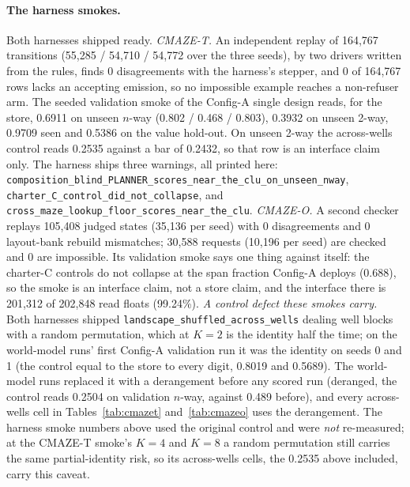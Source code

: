 \documentclass{article} %
\begin{document}
\paragraph{The harness smokes.} Both harnesses shipped ready.
\emph{CMAZE-T.} An independent replay of 164,767 transitions (55,285 / 54,710 / 54,772 over the
three seeds), by two drivers written from the rules, finds 0 disagreements with the harness's
stepper, and 0 of 164,767 rows lacks an accepting emission, so no impossible example reaches a
non-refuser arm. The seeded validation smoke of the Config-A single design reads, for the store,
0.6911 on unseen $n$-way (0.802 / 0.468 / 0.803), 0.3932 on unseen 2-way, 0.9709 seen and 0.5386
on the value hold-out. On unseen 2-way the across-wells control reads 0.2535 against a bar of
0.2432, so that row is an interface claim only. The harness ships three warnings, all printed here:\\
\texttt{composition\_blind\_PLANNER\_scores\_near\_the\_clu\_on\_unseen\_nway},\\
\texttt{charter\_C\_control\_did\_not\_collapse}, and\\
\texttt{cross\_maze\_lookup\_floor\_scores\_near\_the\_clu}.
\emph{CMAZE-O.} A second checker replays 105,408 judged states (35,136 per seed) with 0
disagreements and 0 layout-bank rebuild mismatches; 30,588 requests (10,196 per seed) are checked
and 0 are impossible. Its validation smoke says one thing against itself: the charter-C controls
do not collapse at the span fraction Config-A deploys (0.688), so the smoke is an interface claim,
not a store claim, and the interface there is 201,312 of 202,848 read floats (99.24\%).
\emph{A control defect these smokes carry.} Both harnesses shipped
\texttt{landscape\_shuffled\_across\_wells} dealing well blocks with a random permutation, which at
$K=2$ is the identity half the time; on the world-model runs' first Config-A validation run it was
the identity on seeds 0 and 1 (the control equal to the store to every digit, 0.8019 and 0.5689).
The world-model runs replaced it with a derangement before any scored run (deranged, the control
reads 0.2504 on validation $n$-way, against 0.489 before), and every across-wells cell in
Tables~\ref{tab:cmazet} and~\ref{tab:cmazeo} uses the derangement. The harness smoke numbers above
used the original control and were \emph{not} re-measured; at the CMAZE-T smoke's $K=4$ and $K=8$ a
random permutation still carries the same partial-identity risk, so its across-wells cells,
the 0.2535 above included, carry this caveat.
\end{document}
